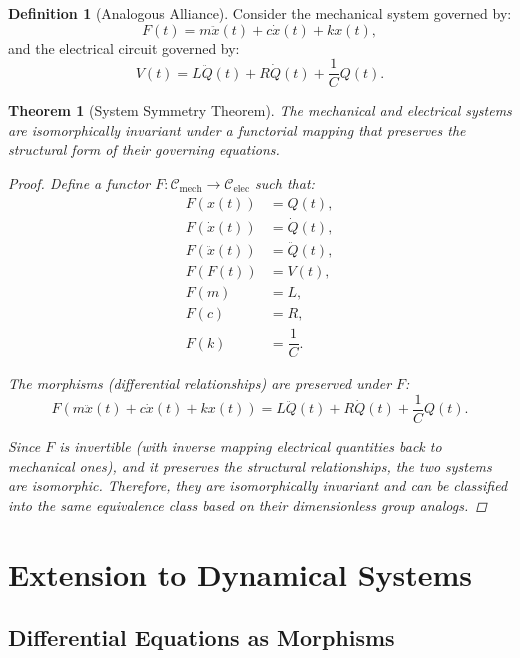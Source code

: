 \documentclass{article}
\newtheorem{theorem}{Theorem}[section]
\theoremstyle{definition}
\newtheorem{definition}{Definition}[section]
\theoremstyle{remark}
\begin{document}
	\begin{definition}[Analogous Alliance]
		Consider the mechanical system governed by:
		\[
		F(t) = m \ddot{x}(t) + c \dot{x}(t) + k x(t),
		\]
		and the electrical circuit governed by:
		\[
		V(t) = L \ddot{Q}(t) + R \dot{Q}(t) + \dfrac{1}{C} Q(t).
		\]
	\end{definition}
	
	\begin{theorem}[System Symmetry Theorem]
		The mechanical and electrical systems are isomorphically invariant under a functorial mapping that preserves the structural form of their governing equations.
		
		\begin{proof}
			Define a functor $F: \mathcal{C}_{\text{mech}} \rightarrow \mathcal{C}_{\text{elec}}$ such that:
			\begin{align*}
				F(x(t)) &= Q(t), \\
				F(\dot{x}(t)) &= \dot{Q}(t), \\
				F(\ddot{x}(t)) &= \ddot{Q}(t), \\
				F(F(t)) &= V(t), \\
				F(m) &= L, \\
				F(c) &= R, \\
				F(k) &= \dfrac{1}{C}.
			\end{align*}
			
			The morphisms (differential relationships) are preserved under $F$:
			\[
			F\left( m \ddot{x}(t) + c \dot{x}(t) + k x(t) \right) = L \ddot{Q}(t) + R \dot{Q}(t) + \dfrac{1}{C} Q(t).
			\]
			
			Since $F$ is invertible (with inverse mapping electrical quantities back to mechanical ones), and it preserves the structural relationships, the two systems are isomorphic. Therefore, they are isomorphically invariant and can be classified into the same equivalence class based on their dimensionless group analogs.
		\end{proof}
	\end{theorem}
	
	\section{Extension to Dynamical Systems}
	
	\subsection{Differential Equations as Morphisms}
	
\end{document}

